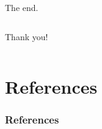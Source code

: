 \documentclass{beamer}
\begin{document}
\begin{frame}{The end.}
\begin{columns}
Thank you!
    
\end{columns}    
    
    
\end{frame}

\section{References}
\begin{frame}[allowframebreaks]\frametitle{References}
        
        
\end{frame}
\end{document}

